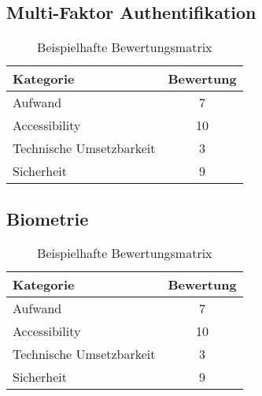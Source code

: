 \subsection{Multi-Faktor Authentifikation}

\begin{table}[h!]
    \caption{Beispielhafte Bewertungsmatrix}
    \begin{center}
        \begin{tabular}{l|c}
            Kategorie                       & Bewertung \\\hline
            Aufwand                         & 7         \\
            Accessibility                   & 10        \\
            Technische Umsetzbarkeit        & 3         \\
            Sicherheit                      & 9         
        \end{tabular}
    \end{center}
\end{table}

\subsection{Biometrie}

\begin{table}[h!]
    \caption{Beispielhafte Bewertungsmatrix}
    \begin{center}
        \begin{tabular}{l|c}
            Kategorie                       & Bewertung \\\hline
            Aufwand                         & 7         \\
            Accessibility                   & 10        \\
            Technische Umsetzbarkeit        & 3         \\
            Sicherheit                      & 9         
        \end{tabular}
    \end{center}
\end{table}